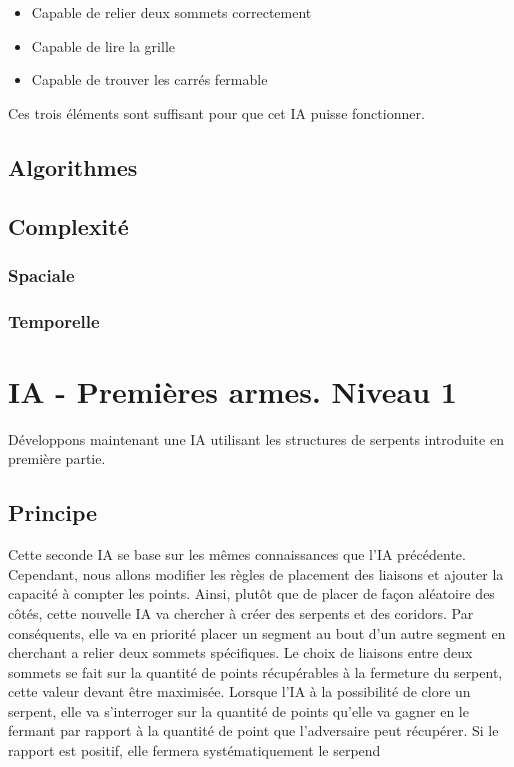 \documentclass[a4paper,12pt]{report}
\begin{document}
\begin{itemize}
 \item Capable de relier deux sommets correctement
 \item Capable de lire la grille
 \item Capable de trouver les carr\'es fermable
\end{itemize}

Ces trois \'el\'ements sont suffisant pour que cet IA puisse fonctionner.

\subsection{Algorithmes}

\subsection{Complexit\'e}

\subsubsection{Spaciale}

\subsubsection{Temporelle}

\section{IA - Premi\`eres armes. Niveau 1}

D\'eveloppons maintenant une IA utilisant les structures de serpents introduite en premi\`ere partie. 

\subsection{Principe}

Cette seconde IA se base sur les m\^emes connaissances que l'IA pr\'ec\'edente. Cependant, nous allons modifier les r\`egles de placement des liaisons et ajouter la capacit\'e \`a compter les points. Ainsi, plut\^ot que de placer de fa\c{c}on al\'eatoire des c\^ot\'es, cette nouvelle IA va chercher \`a cr\'eer des serpents et des coridors. Par cons\'equents, elle va en priorit\'e placer un segment au bout d'un autre segment en cherchant a relier deux sommets sp\'ecifiques. Le choix de liaisons entre deux sommets se fait sur la quantit\'e de points r\'ecup\'erables \`a la fermeture du serpent, cette valeur devant \^etre maximis\'ee. Lorsque l'IA \`a la possibilit\'e de clore un serpent, elle va s'interroger sur la quantit\'e de points qu'elle va gagner en le fermant par rapport \`a la quantit\'e de point que l'adversaire peut r\'ecup\'erer. Si le rapport est positif, elle fermera syst\'ematiquement le serpend
\end{document}
